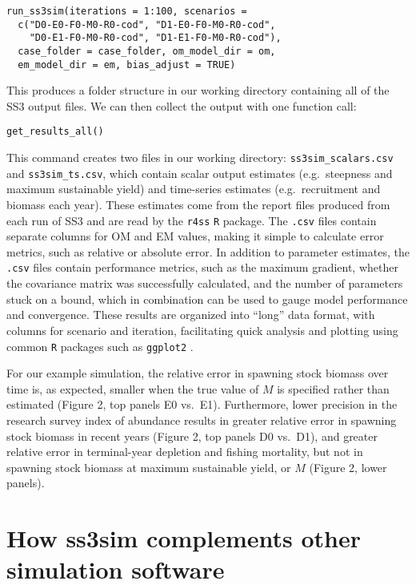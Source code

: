 \documentclass[11pt]{article}
\begin{document}
\begin{verbatim}
run_ss3sim(iterations = 1:100, scenarios =
  c("D0-E0-F0-M0-R0-cod", "D1-E0-F0-M0-R0-cod",
    "D0-E1-F0-M0-R0-cod", "D1-E1-F0-M0-R0-cod"),
  case_folder = case_folder, om_model_dir = om,
  em_model_dir = em, bias_adjust = TRUE)
\end{verbatim}

This produces a folder structure in our working directory containing all of the SS3 output files. We can then collect the output with one function call:

\begin{verbatim}
get_results_all()
\end{verbatim}

\noindent
This command creates two files in our working directory: \texttt{ss3sim\_scalars.csv} and \texttt{ss3sim\_ts.csv}, which contain scalar output estimates (e.g.~steepness and maximum sustainable yield) and time-series estimates (e.g.~recruitment and biomass each year). These estimates come from the report files produced from each run of SS3 and are read by the \texttt{r4ss} \texttt{R} package. The \texttt{.csv} files contain separate columns for OM and EM values, making it simple to calculate error metrics, such as relative or absolute error. In addition to parameter estimates, the \texttt{.csv} files contain performance metrics, such as the maximum gradient, whether the covariance matrix was successfully calculated, and the number of parameters stuck on a bound, which in combination can be used to gauge model performance and convergence. These results are organized into ``long'' data format, with columns for scenario and iteration, facilitating quick analysis and plotting using common \texttt{R} packages such as \texttt{ggplot2} \cite{wickham2009}.

For our example simulation, the relative error in spawning stock biomass over time is, as expected, smaller when the true value of $M$ is specified rather than estimated (Figure 2, top panels E0 vs.~E1). Furthermore, lower precision in the research survey index of abundance results in greater relative error in spawning stock biomass in recent years (Figure 2, top panels D0 vs.~D1), and greater relative error in terminal-year depletion and fishing mortality, but not in spawning stock biomass at maximum sustainable yield, or $M$ (Figure 2, lower panels).

\section*{How ss3sim complements other simulation software}
\end{document}
